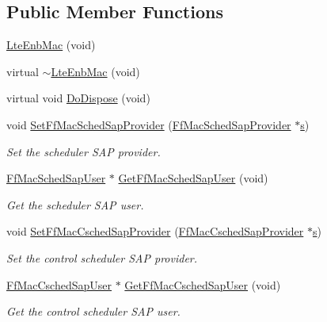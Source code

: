 \subsection*{Public Member Functions}
\begin{DoxyCompactItemize}
\item 
\hyperlink{classns3_1_1LteEnbMac_a4b748b18b45bfd6b0ea03b0de9810b0e}{Lte\+Enb\+Mac} (void)
\item 
virtual \hyperlink{classns3_1_1LteEnbMac_a2cbf954dd1bcb179a81c65cfdf93f3e6}{$\sim$\+Lte\+Enb\+Mac} (void)
\item 
virtual void \hyperlink{classns3_1_1LteEnbMac_a5a0d7464eda10108789731afb5e89cce}{Do\+Dispose} (void)
\item 
void \hyperlink{classns3_1_1LteEnbMac_a7dac3813d90c14f134a10970eab40abe}{Set\+Ff\+Mac\+Sched\+Sap\+Provider} (\hyperlink{classns3_1_1FfMacSchedSapProvider}{Ff\+Mac\+Sched\+Sap\+Provider} $\ast$\hyperlink{generate__test__data__lte__sinr_8m_ad83eeb3a142285d1243a08c6b7026df8}{s})
\begin{DoxyCompactList}\small\item\em Set the scheduler S\+AP provider. \end{DoxyCompactList}\item 
\hyperlink{classns3_1_1FfMacSchedSapUser}{Ff\+Mac\+Sched\+Sap\+User} $\ast$ \hyperlink{classns3_1_1LteEnbMac_a7ca66a59d8d2c66335f6accc4dcbcc01}{Get\+Ff\+Mac\+Sched\+Sap\+User} (void)
\begin{DoxyCompactList}\small\item\em Get the scheduler S\+AP user. \end{DoxyCompactList}\item 
void \hyperlink{classns3_1_1LteEnbMac_a027c543b3f9eead11759cdf5e443c219}{Set\+Ff\+Mac\+Csched\+Sap\+Provider} (\hyperlink{classns3_1_1FfMacCschedSapProvider}{Ff\+Mac\+Csched\+Sap\+Provider} $\ast$\hyperlink{generate__test__data__lte__sinr_8m_ad83eeb3a142285d1243a08c6b7026df8}{s})
\begin{DoxyCompactList}\small\item\em Set the control scheduler S\+AP provider. \end{DoxyCompactList}\item 
\hyperlink{classns3_1_1FfMacCschedSapUser}{Ff\+Mac\+Csched\+Sap\+User} $\ast$ \hyperlink{classns3_1_1LteEnbMac_a1b4683380cb793766be734b07db3a5d4}{Get\+Ff\+Mac\+Csched\+Sap\+User} (void)
\begin{DoxyCompactList}\small\item\em Get the control scheduler S\+AP user. \end{DoxyCompactList}\item 

\end{DoxyCompactItemize}
